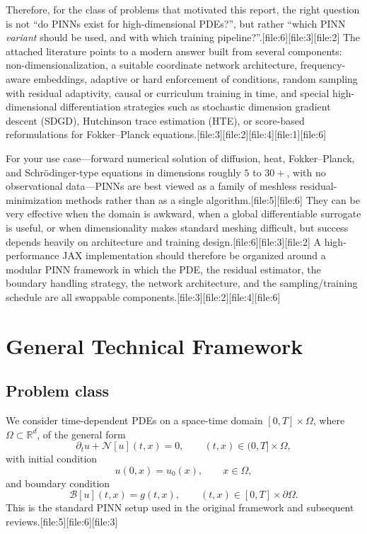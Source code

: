 \documentclass[11pt]{report}
\begin{document}
Therefore, for the class of problems that motivated this report, the right question is not ``do PINNs exist for high-dimensional PDEs?'', but rather ``which PINN \emph{variant} should be used, and with which training pipeline?''.[file:6][file:3][file:2]  
The attached literature points to a modern answer built from several components: non-dimensionalization, a suitable coordinate network architecture, frequency-aware embeddings, adaptive or hard enforcement of conditions, random sampling with residual adaptivity, causal or curriculum training in time, and special high-dimensional differentiation strategies such as stochastic dimension gradient descent (SDGD), Hutchinson trace estimation (HTE), or score-based reformulations for Fokker--Planck equations.[file:3][file:2][file:4][file:1][file:6]

For your use case---forward numerical solution of diffusion, heat, Fokker--Planck, and Schr\"odinger-type equations in dimensions roughly \(5\) to \(30+\), with no observational data---PINNs are best viewed as a family of meshless residual-minimization methods rather than as a single algorithm.[file:5][file:6]  
They can be very effective when the domain is awkward, when a global differentiable surrogate is useful, or when dimensionality makes standard meshing difficult, but success depends heavily on architecture and training design.[file:6][file:3][file:2]  
A high-performance JAX implementation should therefore be organized around a modular PINN framework in which the PDE, the residual estimator, the boundary handling strategy, the network architecture, and the sampling/training schedule are all swappable components.[file:3][file:2][file:4][file:6]

\chapter{General Technical Framework}

\section{Problem class}

We consider time-dependent PDEs on a space-time domain \([0,T]\times \Omega\), where \(\Omega \subset \mathbb{R}^d\), of the general form
\[
\partial_t u + \mathcal{N}[u](t,x) = 0,
\qquad (t,x)\in (0,T]\times \Omega,
\]
with initial condition
\[
u(0,x)=u_0(x),
\qquad x\in \Omega,
\]
and boundary condition
\[
\mathcal{B}[u](t,x)=g(t,x),
\qquad (t,x)\in [0,T]\times \partial\Omega.
\]
This is the standard PINN setup used in the original framework and subsequent reviews.[file:5][file:6][file:3]
\end{document}
